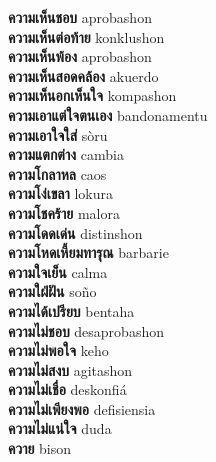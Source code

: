 \textbf{ ความเห็นชอบ  } aprobashon \\
\textbf{ ความเห็นต่อท้าย  } konklushon \\
\textbf{ ความเห็นพ้อง  } aprobashon \\
\textbf{ ความเห็นสอดคล้อง  } akuerdo \\
\textbf{ ความเห็นอกเห็นใจ  } kompashon \\
\textbf{ ความเอาแต่ใจตนเอง  } bandonamentu \\
\textbf{ ความเอาใจใส่  } sòru \\
\textbf{ ความแตกต่าง  } cambia \\
\textbf{ ความโกลาหล  } caos \\
\textbf{ ความโง่เขลา  } lokura \\
\textbf{ ความโชคร้าย  } malora \\
\textbf{ ความโดดเด่น  } distinshon \\
\textbf{ ความโหดเหี้ยมทารุณ  } barbarie \\
\textbf{ ความใจเย็น  } calma \\
\textbf{ ความใฝ่ฝัน  } soño \\
\textbf{ ความได้เปรียบ  } bentaha \\
\textbf{ ความไม่ชอบ  } desaprobashon \\
\textbf{ ความไม่พอใจ  } keho \\
\textbf{ ความไม่สงบ  } agitashon \\
\textbf{ ความไม่เชื่อ  } deskonfiá \\
\textbf{ ความไม่เพียงพอ  } defisiensia \\
\textbf{ ความไม่แน่ใจ  } duda \\
\textbf{ ควาย  } bison \\

